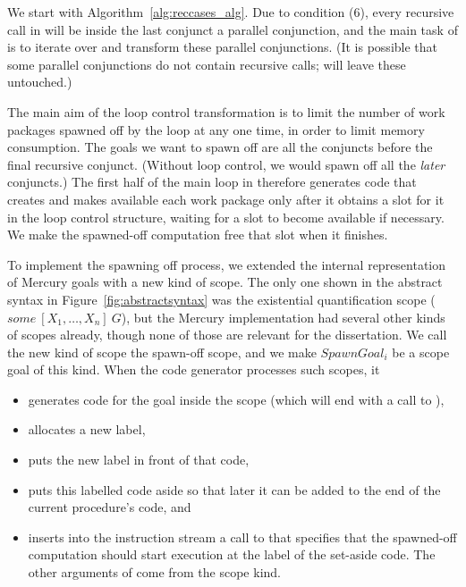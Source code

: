 We start with Algorithm~\ref{alg:reccases_alg}.
Due to condition (6),
every recursive call in 
will be inside the last conjunct a parallel conjunction,
and the main task of \createloopgoal
is to iterate over and transform these parallel conjunctions.
(It is possible that some parallel conjunctions do not contain recursive calls;
\createloopgoal will leave these untouched.)


The main aim of the loop control transformation is
to limit the number of work packages spawned off by the loop at any one time,
in order to limit memory consumption.
The goals we want to spawn off
are all the conjuncts before the final recursive conjunct.
(Without loop control, we would spawn off all the \emph{later} conjuncts.)
The first half of the main loop in \createloopgoal
therefore generates code that creates and makes available each work package
only after it obtains a slot for it in the loop control structure,
waiting for a slot to become available if necessary.
We make the spawned-off computation free that slot when it finishes.

To implement the spawning off process,
we extended the internal representation of Mercury goals
with a new kind of scope.
The only one shown in the abstract syntax in
Figure~\ref{fig:abstractsyntax}
was the existential quantification scope
($some~[X_1,\ldots,X_n]~G$),
but the Mercury implementation had several other kinds of scopes already,
though none of those are relevant for the dissertation.
We call the new kind of scope the spawn-off scope,
and we make $SpawnGoal_i$ be a scope goal of this kind.
When the code generator processes such scopes,
it
\begin{itemize}
\item
generates code for the goal inside the scope
(which will end with a call to \lcjoinandterminate),
\item
allocates a new label,
\item
puts the new label in front of that code,
\item
puts this labelled code aside so that
later it can be added to the end of the current procedure's code, and
\item
inserts into the instruction stream a call to \lcspawnoff
that specifies that the spawned-off computation should start execution
at the label of the set-aside code.
The other arguments of \lcspawnoff come from the scope kind.
\end{itemize}

